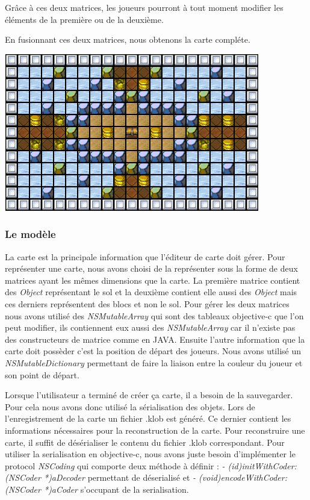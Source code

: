 			Grâce à ces deux matrices, les joueurs pourront à tout moment modifier les éléments de la première ou de la deuxième.
			
			En fusionnant ces deux matrices, nous obtenons la carte compléte.
			\begin{center}
				\includegraphics{./Developpement/Img/image3.png}
			\end{center}
			

	\subsubsection{Le modèle}
		La carte est la principale information que l'éditeur de carte doit gérer. Pour représenter une carte, nous avons choisi de la représenter sous la forme de deux matrices ayant les mêmes dimensions que la carte. La première matrice contient des \textit{Object} représentant le sol et la deuxième contient elle aussi des \textit{Object} mais ces derniers représentent des blocs et non le sol. Pour gérer les deux matrices nous avons utilisé des \textit{NSMutableArray} qui sont des tableaux \gls{objective-c} que l'on peut modifier, ils contiennent eux aussi des \textit{NSMutableArray} car il n'existe pas des constructeurs de matrice comme en JAVA. Ensuite l'autre information que la carte doit possèder c'est la position de départ des joueurs. Nous avons utilisé un \textit{NSMutableDictionary} permettant de faire la liaison entre la couleur du joueur et son point de départ. 
			
		Lorsque l'utilisateur a terminé de créer ça carte, il a besoin de la sauvegarder. Pour cela nous avons donc utilisé la sérialisation des objets. Lors de l'enregistrement de la carte un fichier \og .klob \fg  est généré. Ce dernier contient les informations nécessaires pour la reconstruction de la carte. Pour reconstruire une carte, il suffit de désérialiser le contenu du fichier \og .klob \fg correspondant. Pour utiliser la serialisation en 
		\gls{objective-c}, nous avons juste besoin d'implémenter le protocol \textit{NSCoding} qui comporte deux méthode à définir : 
		\textit{- (id)initWithCoder:(NSCoder *)aDecoder} permettant de déserialisé et \textit{- (void)encodeWithCoder:(NSCoder *)aCoder} s'occupant de la serialisation.
	
